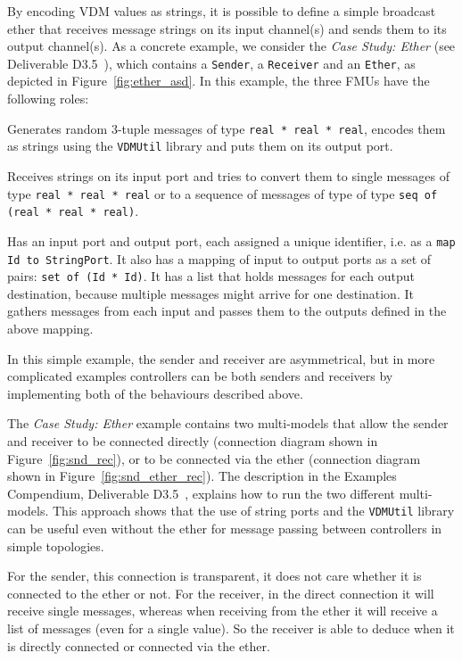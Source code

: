 By encoding VDM values as strings, it is possible to define a simple broadcast ether that receives message strings on its input channel(s) and sends them to its output channel(s). As a concrete example, we consider the \emph{Case Study: Ether} (see Deliverable D3.5~\cite{INTOCPSD3.5}), which contains a \texttt{Sender}, a \texttt{Receiver} and an \texttt{Ether}, as depicted in Figure~\ref{fig:ether_asd}. In this example, the three FMUs have the following roles:

\begin{description}[noitemsep]
  \item[Sender] Generates random 3-tuple messages of type \texttt{real * real * real}, encodes them as strings using the \texttt{VDMUtil} library and puts them on its output port.
  \item[Receiver] Receives strings on its input port and tries to convert them to single messages of type \texttt{real * real * real} or to a sequence of messages of type of type \texttt{seq of (real * real * real)}.
  \item[Ether] Has an input port and output port, each assigned a unique identifier, i.e. as a \texttt{map Id to StringPort}. It also has a mapping of input to output ports as a set of pairs: \texttt{set of (Id * Id)}. It has a list that holds messages for each output destination, because multiple messages might arrive for one destination. It gathers messages from each input and passes them to the outputs defined in the above mapping.
\end{description}

In this simple example, the sender and receiver are asymmetrical, but in more complicated examples controllers can be both senders and receivers by implementing both of the behaviours described above.

The \emph{Case Study: Ether} example contains two multi-models that allow the sender and receiver to be connected directly (connection diagram shown in Figure~\ref{fig:snd_rec}), or to be connected via the ether (connection diagram shown in Figure~\ref{fig:snd_ether_rec}). The description in the Examples Compendium, Deliverable D3.5~\cite{INTOCPSD3.5}, explains how to run the two different multi-models. This approach shows that the use of string ports and the \texttt{VDMUtil} library can be useful even without the ether for message passing between controllers in simple topologies.

For the sender, this connection is transparent, it does not care whether it is connected to the ether or not. For the receiver, in the direct connection it will receive single messages, whereas when receiving from the ether it will receive a list of messages (even for a single value). So the receiver is able to deduce when it is directly connected or connected via the ether. 



